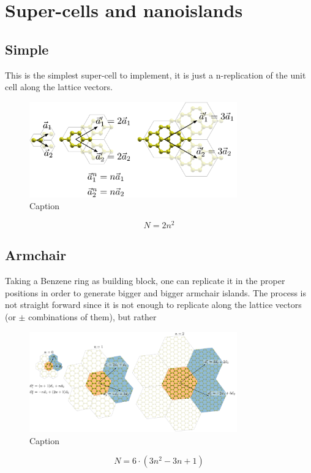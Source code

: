 \chapter{Super-cells and nanoislands}
\section{Simple}
This is the simplest super-cell to implement, it is just a n-replication of the unit cell along the lattice vectors.
\begin{figure}[h!]
\centering
   \includegraphics[width=0.8\textwidth]{appendix/figures/cells_simple.pdf}
\vspace{-5pt}
\caption{Caption}
\label{Label}
\end{figure}
\FloatBarrier
\begin{equation}
   N = 2n^2
\end{equation}


\section{Armchair}
Taking a Benzene ring as building block, one can replicate it in the proper positions in order to generate bigger and bigger armchair islands. The process is not straight forward since it is not enough to replicate along the lattice vectors (or $\pm$ combinations of them), but rather 
\begin{figure}[h!]
\centering
   \includegraphics[width=0.8\textwidth]{appendix/figures/cells_ac.pdf}
\vspace{-5pt}
\caption{Caption}
\label{Label}
\end{figure}
\FloatBarrier
\begin{equation}
   N = 6\cdot(3n^2-3n+1)
\end{equation}

